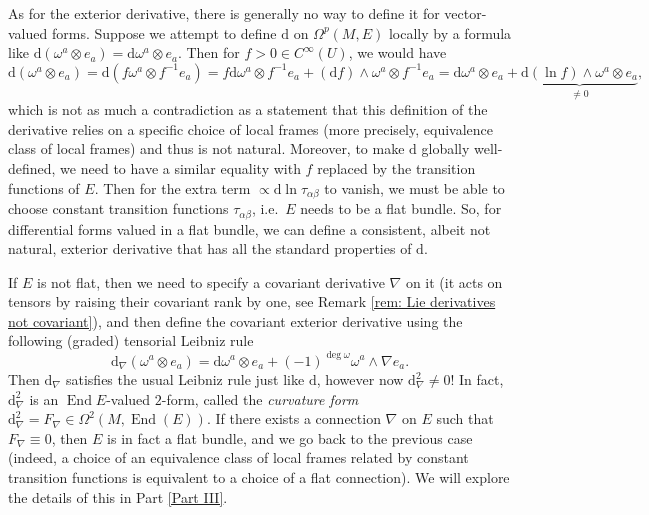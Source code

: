 \documentclass[english,letterpaper]{article}%
\numberwithin{equation}{section}
\numberwithin{figure}{section}
\numberwithin{table}{section}
\theoremstyle{definition}
\theoremstyle{definition}
\theoremstyle{definition}
\theoremstyle{plain}
\theoremstyle{plain}
\theoremstyle{plain}
\theoremstyle{plain}
\theoremstyle{remark}
\theoremstyle{remark}
\def\red{\color{red}}
\newcommand{\dd}{{\mathrm{d}}}
\DeclareMathOperator{\End}{End}
\newcommand{\PRLsep}{   %
           \noindent\makebox[\linewidth]{
                \resizebox{0.5\linewidth}{1pt}{$\blacklozenge$}}}
\begin{document}
As for the exterior derivative, there is generally no way to define it for vector-valued forms.
Suppose we attempt to define $\dd$ on $\Omega^p(M,E)$ locally by a formula like $\dd(\omega^a\otimes e_a)=\dd \omega^a\otimes e_a$. Then for $f>0\in C^\infty(U)$, we would have 
\[\dd(\omega^a\otimes e_a)=\dd(f\omega^a\otimes f^{-1}e_a)=f\dd\omega^a\otimes f^{-1}e_a+(\dd f)\wedge\omega^a\otimes f^{-1}e_a=\dd\omega^a\otimes e_a+\underbrace{\dd(\ln f)\wedge\omega^a\otimes e_a}_{\neq 0},\]
which is not as much a contradiction as a statement that this definition of the derivative relies on a specific choice of local frames (more precisely, equivalence class of local frames) and thus is not natural. Moreover, to make $\dd$ globally well-defined, we need to have a similar equality with $f$ replaced by the transition functions of $E$. Then for the extra term $\propto \dd\ln\tau_{\alpha\beta}$ to vanish, we must be able to choose constant transition functions $\tau_{\alpha\beta}$, i.e.\ $E$ needs to be a flat bundle. So, for differential forms valued in a flat bundle, we can define a consistent, albeit not natural, exterior derivative that has all the standard properties of $\dd$.

If $E$ is not flat, then we need to specify a covariant derivative $\nabla$ on it (it acts on tensors by raising their covariant rank by one, see Remark \ref{rem: Lie derivatives not covariant}), and then define the covariant exterior derivative using the following (graded) tensorial Leibniz rule
\[\dd_\nabla(\omega^a\otimes e_a)=\dd\omega^a\otimes e_a+(-1)^{\deg \omega}\omega^a\wedge\nabla e_a.\]
Then $\dd_\nabla$ satisfies the usual Leibniz rule just like $\dd$, however now $\dd_\nabla^2\neq 0$! In fact, $\dd_\nabla^2$ is an $\End{E}$-valued $2$-form, called the \emph{curvature form} $\dd_\nabla^2=F_\nabla\in\Omega^2(M,\End(E))$. If there exists a connection $\nabla $ on $E$ such that $F_\nabla\equiv 0$, then $E$ is in fact a flat bundle, and we go back to the previous case (indeed, a choice of an equivalence class of local frames related by constant transition functions is equivalent to a choice of a flat connection). We will explore the details of this in Part \ref{Part III}.

\end{document}
